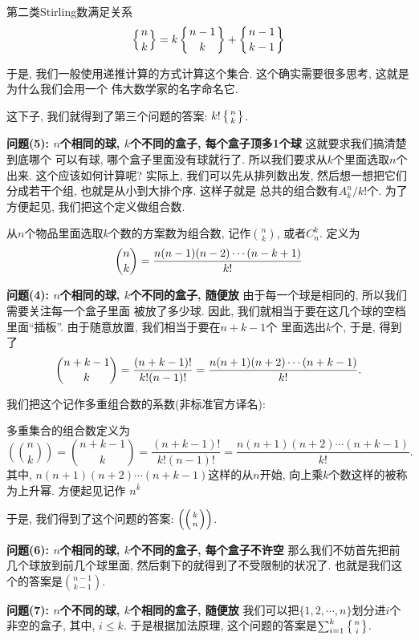 \begin{theorem}
    第二类Stirling数满足关系
    $$
        \left\{{n \atop k}\right\}=k\left\{{n-1 \atop k}\right\}+\left\{{n-1 \atop k-1}\right\}
    $$
\end{theorem}

于是, 我们一般使用递推计算的方式计算这个集合. 这个确实需要很多思考, 这就是为什么我们会用一个
伟大数学家的名字命名它.

这下子, 我们就得到了第三个问题的答案: $k! \left\{{n \atop k}\right\}$.

\textbf{问题(5): $n$个相同的球, $k$个不同的盒子, 每个盒子顶多1个球} 这就要求我们搞清楚到底哪个
可以有球, 哪个盒子里面没有球就行了. 所以我们要求从$k$个里面选取$n$个出来. 这个应该如何计算呢?
实际上, 我们可以先从排列数出发, 然后想一想把它们分成若干个组, 也就是从小到大排个序. 这样子就是
总共的组合数有$A_k^n/k!$个. 为了方便起见, 我们把这个定义做组合数.

\begin{definition}[组合数]
    从$n$个物品里面选取$k$个数的方案数为组合数, 记作${n\choose k}$, 或者$C_n^k$. 定义为
    $$
        {n\choose k}={n(n-1)(n-2)\cdots(n-k+1)\over k!}
    $$
\end{definition}


\textbf{问题(4): $n$个相同的球, $k$个不同的盒子, 随便放} 由于每一个球是相同的, 所以我们需要关注每一个盒子里面
被放了多少球. 因此, 我们就相当于要在这几个球的空档里面``插板''. 由于随意放置, 我们相当于要在$n+k-1$个
里面选出$k$个, 于是, 得到了
$$
    {n+k-1\choose k} = \frac{(n+k-1)!}{k!(n-1)!} = {n(n+1)(n+2)\cdots(n+k-1)\over k!}.
$$

我们把这个记作多重组合数的系数(非标准官方译名):

\begin{definition}[多重集合组合数]
    多重集合的组合数定义为
    $$
        \left(\binom nk\right)=\binom{n+k-1}k=\frac{(n+k-1)!}{k!\left(n-1\right)!}=\frac{n(n+1)(n+2)\cdots(n+k-1)}{k!}.
    $$
    其中, $n(n+1)(n+2)\cdots(n+k-1)$这样的从$n$开始, 向上乘$k$个数这样的被称为上升幂. 方便起见记作
    $n^{\bar k}$
\end{definition}
于是, 我们得到了这个问题的答案: $\left(\left({k \atop n}\right)\right)$.

\textbf{问题(6): $n$个相同的球, $k$个不同的盒子, 每个盒子不许空} 那么我们不妨首先把前几个球放到前几个球里面,
然后剩下的就得到了不受限制的状况了. 也就是我们这个的答案是${n-1\choose k-1}. $

\textbf{问题(7): $n$个不同的球, $k$个相同的盒子, 随便放} 我们可以把$\{1,2,\cdots,n\}$划分进$i$个非空的盒子,
其中, $i\leq k$. 于是根据加法原理, 这个问题的答案是$\sum_{i=1}^{k}\left\{{n \atop i}\right\}$.

